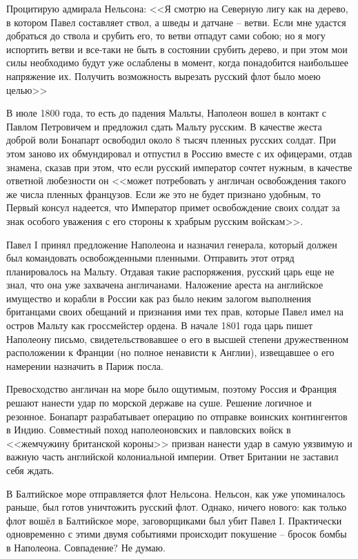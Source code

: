 \documentclass[a4paper,12pt]{diss_4}
\begin{document}
 Процитирую адмирала Нельсона:  <<Я смотрю на Северную лигу как на дерево, в котором Павел составляет ствол, а шведы и датчане -- ветви. Если мне удастся добраться до ствола и срубить его, то ветви отпадут сами собою; но я могу испортить ветви и все-таки не быть в состоянии срубить дерево, и при этом мои силы необходимо будут уже ослаблены в момент, когда понадобится наибольшее напряжение их. Получить возможность вырезать русский флот было моею целью>>

 В июле 1800 года, то есть до падения Мальты, Наполеон вошел в контакт с Павлом Петровичем и предложил сдать Мальту русским. В качестве жеста доброй воли Бонапарт освободил около 8 тысяч пленных русских солдат. При этом заново их обмундировал и отпустил в Россию вместе с их офицерами, отдав знамена, сказав при этом, что если русский император сочтет нужным, в качестве ответной любезности он <<может потребовать у англичан освобождения такого же числа пленных французов. Если же это не будет признано удобным, то Первый консул надеется, что Император примет освобождение своих солдат за знак особого уважения с его стороны к храбрым русским войскам>>.

 Павел I принял предложение Наполеона и назначил генерала, который должен был командовать освобожденными пленными. Отправить этот отряд планировалось на Мальту. Отдавая такие распоряжения, русский царь еще не знал, что она уже захвачена англичанами. Наложение ареста на английское имущество и корабли в России как раз было неким залогом выполнения британцами своих обещаний и признания ими тех прав, которые Павел имел на остров Мальту как гроссмейстер ордена. В начале 1801 года царь пишет Наполеону письмо, свидетельствовавшее о его в высшей степени дружественном расположении к Франции (но полное ненависти к Англии), извещавшее о его намерении назначить в Париж посла.

 Превосходство англичан на море было ощутимым, поэтому Россия и Франция решают нанести удар по морской державе на суше. Решение логичное и резонное. Бонапарт разрабатывает операцию по отправке воинских контингентов в Индию. Совместный поход наполеоновских и павловских войск в <<жемчужину британской короны>> призван нанести удар в самую уязвимую и важную часть английской колониальной империи. Ответ Британии не заставил себя ждать. 

 В Балтийское море отправляется флот Нельсона. Нельсон, как уже упоминалось раньше, был готов уничтожить русский флот. Однако, ничего нового: как только флот вошёл в Балтийское море, заговорщиками был убит Павел I. Практически одновременно с этими двумя событиями происходит покушение -- бросок бомбы в Наполеона. Совпадение? Не думаю.
\end{document}

